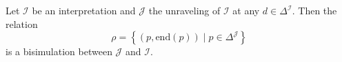 \begin{lemma}\label{lem:tree model bisimulation}
	Let $\mathcal{I}$ be an interpretation and $\mathcal{J}$ the unraveling of $\mathcal{I}$ at any $d \in \Delta^{\mathcal{I}}$.
	Then the relation
	\[
		\rho = \left\{ (p,\text{end}(p)) \mid p \in \Delta^{\mathcal{J}} \right\}
	\]
	is a bisimulation between $\mathcal{J}$ and $\mathcal{I}$.
\end{lemma}
